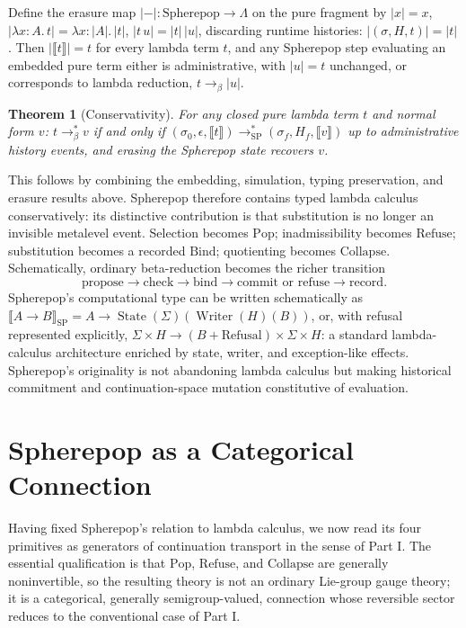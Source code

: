 \documentclass[11pt]{article}
\newtheorem{theorem}{Theorem}[section]
\newcommand{\Pop}{\mathrm{Pop}}
\newcommand{\Refuse}{\mathrm{Refuse}}
\newcommand{\Bind}{\mathrm{Bind}}
\newcommand{\Collapse}{\mathrm{Collapse}}
\begin{document}
Define the erasure map $|-| : \mathrm{Spherepop} \to \Lambda$ on the pure fragment by $|x| = x$, $|\lambda x{:}A.\,t| = \lambda x{:}|A|.\,|t|$, $|t\,u| = |t|\,|u|$, discarding runtime histories: $|(\sigma, H, t)| = |t|$. Then $|\llbracket t \rrbracket| = t$ for every lambda term $t$, and any Spherepop step evaluating an embedded pure term either is administrative, with $|u| = t$ unchanged, or corresponds to lambda reduction, $t \longrightarrow_\beta |u|$.

\begin{theorem}[Conservativity]
For any closed pure lambda term $t$ and normal form $v$: $t \longrightarrow_\beta^\ast v$ if and only if $(\sigma_0, \epsilon, \llbracket t \rrbracket) \longrightarrow_{\mathrm{SP}}^\ast (\sigma_f, H_f, \llbracket v \rrbracket)$ up to administrative history events, and erasing the Spherepop state recovers $v$.
\end{theorem}

This follows by combining the embedding, simulation, typing preservation, and erasure results above. Spherepop therefore contains typed lambda calculus conservatively: its distinctive contribution is that substitution is no longer an invisible metalevel event. Selection becomes $\Pop$; inadmissibility becomes $\Refuse$; substitution becomes a recorded $\Bind$; quotienting becomes $\Collapse$. Schematically, ordinary beta-reduction becomes the richer transition
\[
\text{propose} \to \text{check} \to \text{bind} \to \text{commit or refuse} \to \text{record}.
\]
Spherepop's computational type can be written schematically as $\llbracket A \to B \rrbracket_{\mathrm{SP}} = A \to \operatorname{State}(\Sigma)(\operatorname{Writer}(H)(B))$, or, with refusal represented explicitly, $\Sigma \times H \to (B + \mathrm{Refusal}) \times \Sigma \times H$: a standard lambda-calculus architecture enriched by state, writer, and exception-like effects. Spherepop's originality is not abandoning lambda calculus but making historical commitment and continuation-space mutation constitutive of evaluation.

\section{Spherepop as a Categorical Connection}
\label{sec:sp-connection}

Having fixed Spherepop's relation to lambda calculus, we now read its four primitives as generators of continuation transport in the sense of Part I. The essential qualification is that $\Pop$, $\Refuse$, and $\Collapse$ are generally noninvertible, so the resulting theory is not an ordinary Lie-group gauge theory; it is a categorical, generally semigroup-valued, connection whose reversible sector reduces to the conventional case of Part I.
\end{document}
